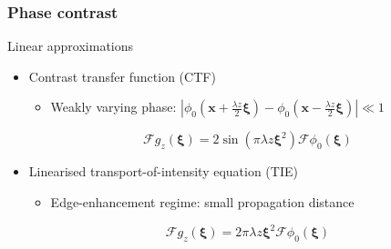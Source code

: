 \documentclass{beamer}
\renewcommand{\vec}{\mathbold}
\newcommand{\vecx}{\vec{x}}
\newcommand{\vecxi}{\vec{\xi}}
\newcommand{\abs}[1]{\left| #1 \right|} %
\newcommand{\F}{\mathcal{F}}
\begin{document}
\begin{frame}
  \frametitle{Phase contrast}

    Linear approximations

    \begin{itemize}
    \item Contrast transfer function (CTF)
      \begin{itemize}
      \item Weakly varying phase:
      $\abs{\phi_0(\vecx+\tfrac{\lambda z}{2}\vecxi)
        -\phi_0(\vecx-\tfrac{\lambda z}{2}\vecxi)}\ll 1$
    \end{itemize}

    \begin{equation*}
          \F g_z(\vecxi) = 2\sin(\pi\lambda z\vecxi^2) \F\phi_0(\vecxi)
        \end{equation*}
  \end{itemize}
  \vfill
  \begin{itemize}
  \item Linearised transport-of-intensity equation (TIE)
    \begin{itemize}
    \item Edge-enhancement regime: small propagation distance
    \end{itemize}

    \begin{equation*}
      \F g_z(\vecxi)  = 2\pi\lambda z\vecxi^2 \F\phi_0(\vecxi) 
    \end{equation*}
  \end{itemize}
  \vfill
\end{frame}
\end{document}
